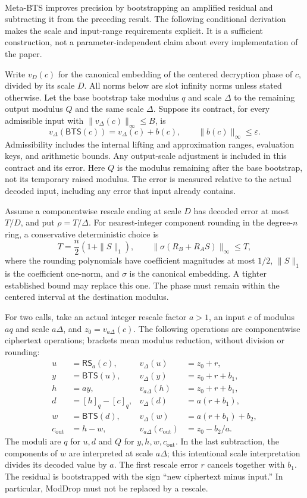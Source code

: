 $ $

 Meta-BTS improves precision by bootstrapping an amplified residual and subtracting it from the preceding result. The following conditional derivation makes the scale and input-range requirements explicit. It is a sufficient construction, not a parameter-independent claim about every implementation of the paper.

Write $v_D(c)$ for the canonical embedding of the centered decryption phase of $c$, divided by its scale $D$. All norms below are slot infinity norms unless stated otherwise. Let the base bootstrap take modulus $q$ and scale $\Delta$ to the remaining output modulus $Q$ and the same scale $\Delta$. Suppose its contract, for every admissible input with $\|v_\Delta(c)\|_\infty\leq B$, is
\[
v_\Delta(\mathsf{BTS}(c))=v_\Delta(c)+b(c),
\qquad \|b(c)\|_\infty\leq\varepsilon.
\]
Admissibility includes the internal lifting and approximation ranges, evaluation keys, and arithmetic bounds. Any output-scale adjustment is included in this contract and its error. Here $Q$ is the modulus remaining after the base bootstrap, not its temporary raised modulus. The error is measured relative to the actual decoded input, including any error that input already contains.

Assume a componentwise rescale ending at scale $D$ has decoded error at most $T/D$, and put $\rho=T/\Delta$. For nearest-integer component rounding in the degree-$n$ ring, a conservative deterministic choice is
\[
T=\frac{n}{2}(1+\|S\|_1),
\qquad
\|\sigma(R_B+R_AS)\|_\infty\leq T,
\]
where the rounding polynomials have coefficient magnitudes at most $1/2$, $\|S\|_1$ is the coefficient one-norm, and $\sigma$ is the canonical embedding. A tighter established bound may replace this one. The phase must remain within the centered interval at the destination modulus.

For two calls, take an actual integer rescale factor $a>1$, an input $c$ of modulus $aq$ and scale $a\Delta$, and $z_0=v_{a\Delta}(c)$. The following operations are componentwise ciphertext operations; brackets mean modulus reduction, without division or rounding:
\begin{align*}
u&=\mathsf{RS}_a(c), &v_\Delta(u)&=z_0+r,\\
y&=\mathsf{BTS}(u), &v_\Delta(y)&=z_0+r+b_1,\\
h&=ay, &v_{a\Delta}(h)&=z_0+r+b_1,\\
d&=[h]_q-[c]_q, &v_\Delta(d)&=a(r+b_1),\\
w&=\mathsf{BTS}(d), &v_\Delta(w)&=a(r+b_1)+b_2,\\
c_{\mathrm{out}}&=h-w, &v_{a\Delta}(c_{\mathrm{out}})&=z_0-b_2/a.
\end{align*}
The moduli are $q$ for $u,d$ and $Q$ for $y,h,w,c_{\mathrm{out}}$. In the last subtraction, the components of $w$ are interpreted at scale $a\Delta$; this intentional scale interpretation divides its decoded value by $a$. The first rescale error $r$ cancels together with $b_1$. The residual is bootstrapped with the sign ``new ciphertext minus input.'' In particular, ModDrop must not be replaced by a rescale.

